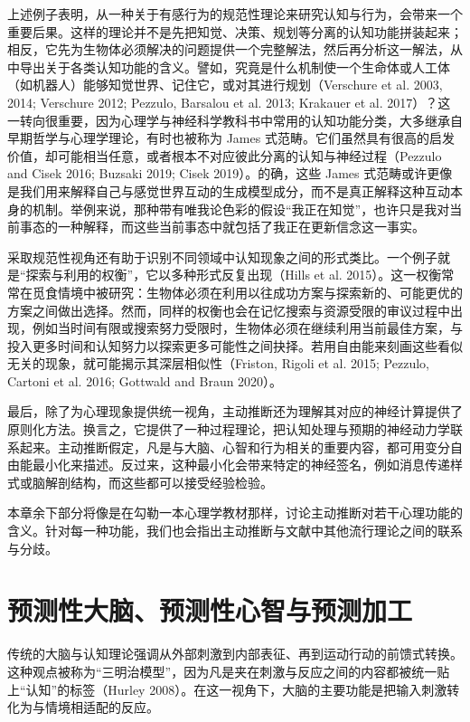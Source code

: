 上述例子表明，从一种关于有感行为的规范性理论来研究认知与行为，会带来一个重要后果。这样的理论并不是先把知觉、决策、规划等分离的认知功能拼装起来；相反，它先为生物体必须解决的问题提供一个完整解法，然后再分析这一解法，从中导出关于各类认知功能的含义。譬如，究竟是什么机制使一个生命体或人工体（如机器人）能够知觉世界、记住它，或对其进行规划（Verschure et al. 2003, 2014; Verschure 2012; Pezzulo, Barsalou et al. 2013; Krakauer et al. 2017）？这一转向很重要，因为心理学与神经科学教科书中常用的认知功能分类，大多继承自早期哲学与心理学理论，有时也被称为 James 式范畴。它们虽然具有很高的启发价值，却可能相当任意，或者根本不对应彼此分离的认知与神经过程（Pezzulo and Cisek 2016; Buzsaki 2019; Cisek 2019）。的确，这些 James 式范畴或许更像是我们用来解释自己与感觉世界互动的生成模型成分，而不是真正解释这种互动本身的机制。举例来说，那种带有唯我论色彩的假设“我正在知觉”，也许只是我对当前事态的一种解释，而这些当前事态中就包括了我正在更新信念这一事实。

采取规范性视角还有助于识别不同领域中认知现象之间的形式类比。一个例子就是“探索与利用的权衡”，它以多种形式反复出现（Hills et al. 2015）。这一权衡常常在觅食情境中被研究：生物体必须在利用以往成功方案与探索新的、可能更优的方案之间做出选择。然而，同样的权衡也会在记忆搜索与资源受限的审议过程中出现，例如当时间有限或搜索努力受限时，生物体必须在继续利用当前最佳方案，与投入更多时间和认知努力以探索更多可能性之间抉择。若用自由能来刻画这些看似无关的现象，就可能揭示其深层相似性（Friston, Rigoli et al. 2015; Pezzulo, Cartoni et al. 2016; Gottwald and Braun 2020）。

最后，除了为心理现象提供统一视角，主动推断还为理解其对应的神经计算提供了原则化方法。换言之，它提供了一种过程理论，把认知处理与预期的神经动力学联系起来。主动推断假定，凡是与大脑、心智和行为相关的重要内容，都可用变分自由能最小化来描述。反过来，这种最小化会带来特定的神经签名，例如消息传递样式或脑解剖结构，而这些都可以接受经验检验。

本章余下部分将像是在勾勒一本心理学教材那样，讨论主动推断对若干心理功能的含义。针对每一种功能，我们也会指出主动推断与文献中其他流行理论之间的联系与分歧。

\section{预测性大脑、预测性心智与预测加工}

传统的大脑与认知理论强调从外部刺激到内部表征、再到运动行动的前馈式转换。这种观点被称为“三明治模型”，因为凡是夹在刺激与反应之间的内容都被统一贴上“认知”的标签（Hurley 2008）。在这一视角下，大脑的主要功能是把输入刺激转化为与情境相适配的反应。

